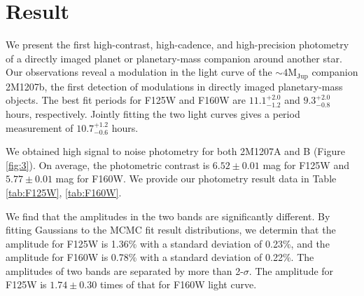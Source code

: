 \documentclass[apj]{emulateapj}
\newcommand{\revise}[1]{\textbf{{\color{cyan}{#1}}}}
\renewcommand{\revise}{}
\newcommand{\period}{$10.7^{+1.2}_{-0.6}$}
\begin{document}


\section{Result}
\label{Results}

We present the first high-contrast, high-cadence, and high-precision
photometry of a directly imaged planet or planetary-mass
companion around another star. Our observations reveal a modulation in the light curve of
the $\sim 4 \mathrm{M_{{Jup}}}$ companion 2M1207b, the first detection
of modulations in directly imaged planetary-mass objects. The best
fit periods for F125W and F160W are $11.1_{-1.2}^{+2.0}$  and $9.3_{-0.8}^{+2.0}$ hours,
respectively. Jointly fitting the two light curves gives a period
measurement of \period{} hours.

We obtained high signal to noise photometry for both 2M1207A
and B (Figure \ref{fig:3}). On average, the photometric contrast is
$6.52\pm0.01$ mag for F125W and $5.77\pm0.01$ mag for F160W. We
provide our photometry result data in Table \ref{tab:F125W}, \ref{tab:F160W}.



We find that the amplitudes in the two bands are
significantly different. By fitting Gaussians to the MCMC fit result
distributions, we determin that the  amplitude for F125W is
1.36\% with a standard deviation of 0.23\%, and  the amplitude for F160W is
0.78\% with a standard deviation of 0.22\%. The amplitudes of two
bands are separated by more than 2-$\sigma$. The amplitude
for F125W is $1.74\pm0.30$ times of that for F160W light curve.
\end{document}
